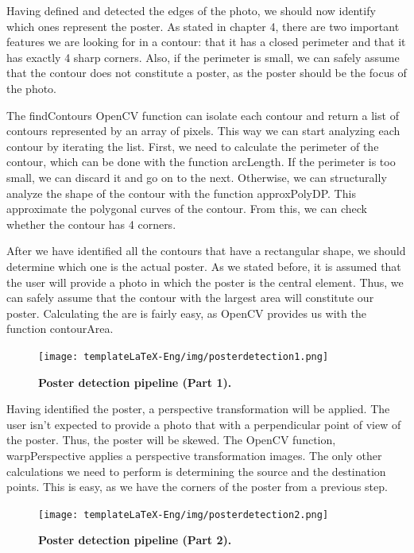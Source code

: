 \documentclass[12pt,a4paper,twoside]{report}
\begin{document}
Having defined and detected the edges of the photo, we should now identify which ones represent the poster. As stated in chapter 4, there are two important features we are looking for in a contour: that it has a closed perimeter and that it has exactly 4 sharp corners. Also, if the perimeter is small, we can safely assume that the contour does not constitute a poster, as the poster should be the focus of the photo.

The findContours OpenCV function can isolate each contour and return a list of contours represented by an array of pixels. This way we can start analyzing each contour by iterating the list. First, we need to calculate the perimeter of the contour, which can be done with the function arcLength. If the perimeter is too small, we can discard it and go on to the next. Otherwise, we can structurally analyze the shape of the contour with the function approxPolyDP. This approximate the polygonal curves of the contour. From this, we can check whether the contour has 4 corners.

After we have identified all the contours that have a rectangular shape, we should determine which one is the actual poster. As we stated before, it is assumed that the user will provide a photo in which the poster is the central element. Thus, we can safely assume that the contour with the largest area will constitute our poster. Calculating the are is fairly easy, as OpenCV provides us with the function contourArea.

 \begin{figure}[H]
    \begin{center}
        \texttt{[image: templateLaTeX-Eng/img/posterdetection1.png]}
        \caption{\bf Poster detection pipeline (Part 1).}
    \end{center}
\end{figure}

Having identified the poster, a perspective transformation will be applied. The user isn't expected to provide a photo that with a perpendicular point of view of the poster. Thus, the poster will be skewed. The OpenCV function, warpPerspective applies a perspective transformation images. The only other calculations we need to perform is determining the source and the destination points. This is easy, as we have the corners of the poster from a previous step.

 \begin{figure}[H]
    \begin{center}
        \texttt{[image: templateLaTeX-Eng/img/posterdetection2.png]}
        \caption{\bf Poster detection pipeline (Part 2).}
    \end{center}
\end{figure}
\end{document}
